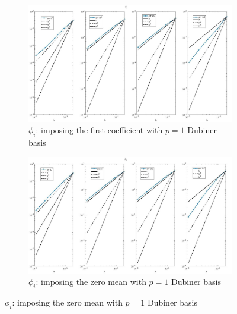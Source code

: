 \documentclass[a4paper,11pt]{article}
\begin{document}
\begin{figure}[H]
\caption{Comparison of the intracellular potential ($\phi_i$)}
\label{phii-unique}
\begin{subfigure}{\textwidth}
\begin{center}
\includegraphics[width = \textwidth]{./errors/D1_Phii_1.jpg}
\caption{$\phi_i$: imposing the first coefficient with $p=1$ Dubiner basis}
\end{center}
\end{subfigure}
\begin{subfigure}{\textwidth}	
\begin{center}
\includegraphics[width =\textwidth]{./errors/D1_Phii_2.jpg}
\caption{$\phi_i$: imposing the zero mean with $p=1$ Dubiner basis}
\end{center}
\end{subfigure}
\end{figure}
\newpage
\end{document}

